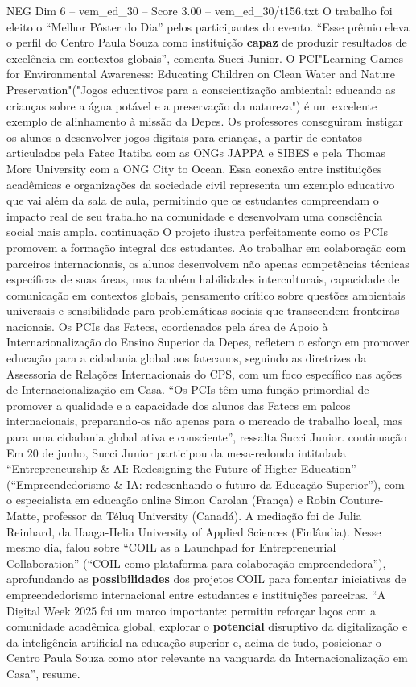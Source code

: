 \begin{textsample}{NEG Dim 6 – vem\_ed\_30 – Score 3.00 – vem\_ed\_30/t156.txt}
O trabalho foi eleito o “Melhor Pôster do Dia” pelos participantes do evento. “Esse prêmio eleva o perfil do Centro Paula Souza como instituição \textbf{capaz} de produzir resultados de excelência em contextos globais”, comenta Succi Junior.
O PCI"Learning Games for Environmental Awareness: Educating Children on Clean Water and Nature Preservation"("Jogos educativos para a conscientização ambiental: educando as crianças sobre a água potável e a preservação da natureza") é um excelente exemplo de alinhamento à missão da Depes.
Os professores conseguiram instigar os alunos a desenvolver jogos digitais para crianças, a partir de contatos articulados pela Fatec Itatiba com as ONGs JAPPA e SIBES e pela Thomas More University com a ONG City to Ocean.
Essa conexão entre instituições acadêmicas e organizações da sociedade civil representa um exemplo educativo que vai além da sala de aula, permitindo que os estudantes compreendam o impacto real de seu trabalho na comunidade e desenvolvam uma consciência social mais ampla. continuação O projeto ilustra perfeitamente como os PCIs promovem a formação integral dos estudantes.
Ao trabalhar em colaboração com parceiros internacionais, os alunos desenvolvem não apenas competências técnicas específicas de suas áreas, mas também habilidades interculturais, capacidade de comunicação em contextos globais, pensamento crítico sobre questões ambientais universais e sensibilidade para problemáticas sociais que transcendem fronteiras nacionais.
Os PCIs das Fatecs, coordenados pela área de Apoio à Internacionalização do Ensino Superior da Depes, refletem o esforço em promover educação para a cidadania global aos fatecanos, seguindo as diretrizes da Assessoria de Relações Internacionais do CPS, com um foco específico nas ações de Internacionalização em Casa. “Os PCIs têm uma função primordial de promover a qualidade e a capacidade dos alunos das Fatecs em palcos internacionais, preparando-os não apenas para o mercado de trabalho local, mas para uma cidadania global ativa e consciente”, ressalta Succi Junior. continuação Em 20 de junho, Succi Junior participou da mesa-redonda intitulada “Entrepreneurship \& AI: Redesigning the Future of Higher Education” (“Empreendedorismo \& IA: redesenhando o futuro da Educação Superior”), com o especialista em educação online Simon Carolan (França) e Robin Couture-Matte, professor da Téluq University (Canadá).
A mediação foi de Julia Reinhard, da Haaga-Helia University of Applied Sciences (Finlândia).
Nesse mesmo dia, falou sobre “COIL as a Launchpad for Entrepreneurial Collaboration” (“COIL como plataforma para colaboração empreendedora”), aprofundando as \textbf{possibilidades} dos projetos COIL para fomentar iniciativas de empreendedorismo internacional entre estudantes e instituições parceiras. “A Digital Week 2025 foi um marco importante: permitiu reforçar laços com a comunidade acadêmica global, explorar o \textbf{potencial} disruptivo da digitalização e da inteligência artificial na educação superior e, acima de tudo, posicionar o Centro Paula Souza como ator relevante na vanguarda da Internacionalização em Casa”, resume.

\end{textsample}
